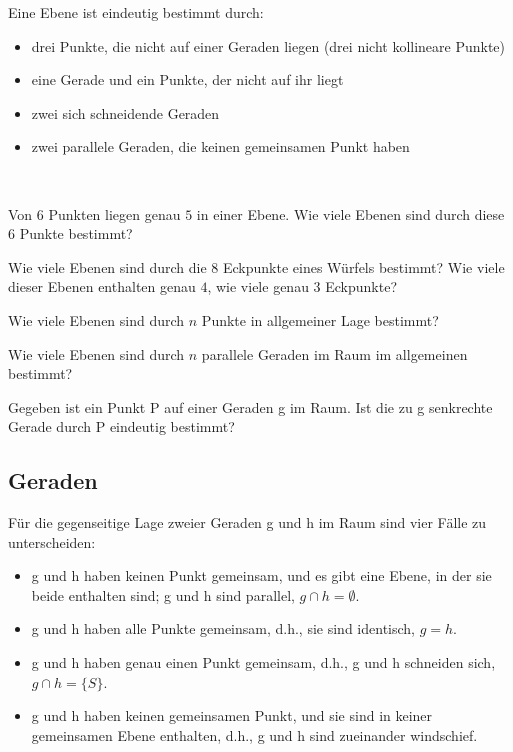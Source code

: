 \documentclass[%
11pt,%
twoside,%
titlepage,%
german,%
headsepline%
]{scrartcl}
\begin{document}
\noindent Eine Ebene ist eindeutig bestimmt durch:
\begin{itemize}
\item drei Punkte, die nicht auf einer Geraden liegen (drei nicht kollineare Punkte)
\item eine Gerade und ein Punkte, der nicht auf ihr liegt
\item zwei sich schneidende Geraden
\item zwei parallele Geraden, die keinen gemeinsamen Punkt haben
\end{itemize}

\begin{ueb} \ \\[-4ex]
\begin{enumeratea}
\item Von $6$ Punkten liegen genau $5$ in einer Ebene. Wie viele Ebenen sind durch diese $6$ Punkte bestimmt?
\item Wie viele Ebenen sind durch die $8$ Eckpunkte eines W\"urfels bestimmt? Wie viele dieser Ebenen enthalten genau $4$, wie viele genau $3$ Eckpunkte?
\item Wie viele Ebenen sind durch $n$ Punkte in allgemeiner Lage bestimmt?
\item Wie viele Ebenen sind durch $n$ parallele Geraden im Raum im allgemeinen bestimmt?
\end{enumeratea}
\end{ueb}

\begin{ueb}
Gegeben ist ein Punkt P auf einer Geraden g im Raum. Ist die zu g senkrechte Gerade durch P eindeutig bestimmt?
\end{ueb}

\subsection{Geraden}

F\"ur die gegenseitige Lage zweier Geraden g und h im Raum sind vier F\"alle zu unterscheiden:
\begin{itemize}
\item g und h haben keinen Punkt gemeinsam, und es gibt eine Ebene, in der sie beide enthalten sind; g und h sind parallel, $g\cap h=\emptyset$.
\item g und h haben alle Punkte gemeinsam, d.h., sie sind identisch, $g=h$.
\item g und h haben genau einen Punkt gemeinsam, d.h., g und h schneiden sich, $g\cap h=\{S\}$.
\item g und h haben keinen gemeinsamen Punkt, und sie sind in keiner gemeinsamen Ebene enthalten, d.h., g und h sind zueinander windschief.
\end{itemize}
\end{document}
